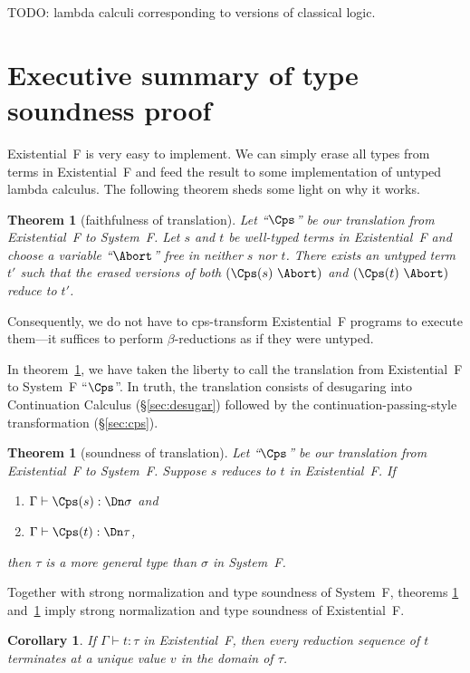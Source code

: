 \documentclass{amsart}
\newtheorem{theorem}[subsection]{Theorem}
\newtheorem{corollary}[subsection]{Corollary}
\begin{document}
TODO: lambda calculi corresponding to versions of classical
logic.


\section{Executive summary of type soundness proof}
\label{sec:exe}

Existential~F is very easy to implement. We can simply erase all
types from terms in Existential~F and feed the result to some
implementation of untyped lambda calculus. The following theorem
sheds some light on why it works.

\begin{theorem}
[faithfulness of translation]
\label{thm:faith}
Let ``$\Cps$'' be our translation from Existential~F to System~F.
Let $s$ and $t$ be well-typed terms in Existential~F and choose a
variable ``$\Abort$'' free in neither $s$ nor $t$. There exists
an untyped term $t'$ such that the erased versions of both
$(\Cps(s)~\Abort)$ and $(\Cps(t)~\Abort)$ reduce to $t'$.
\end{theorem}

Consequently, we do not have to cps-transform Existential~F
programs to execute them---it suffices to perform
$\beta$-reductions as if they were untyped.

In theorem~\ref{thm:faith}, we have taken the liberty to
call the translation from Existential~F to System~F ``$\Cps$''.
In truth, the translation consists of desugaring into
Continuation Calculus (\S\ref{sec:desugar}) followed by
the continuation-passing-style transformation (\S\ref{sec:cps}).

\begin{theorem}
[soundness of translation]
\label{thm:sound}
Let ``$\Cps$'' be our translation from Existential~F to System~F.
Suppose $s$ reduces to $t$ in Existential~F. If
\begin{enumerate}
\item $\Gamma\vdash\Cps(s):\Dn\sigma$ and\/
\item $\Gamma\vdash\Cps(t):\Dn\tau$,
\end{enumerate}
then $\tau$ is a more general type than $\sigma$ in System~F.
\end{theorem}

Together with strong normalization and type soundness of
System~F, theorems \ref{thm:faith} and~\ref{thm:sound} imply
strong normalization and type soundness of Existential~F.

\begin{corollary}
\label{cor:sound}
If\/ $\Gamma\vdash t:\tau$ in Existential~F, then every reduction
sequence of $t$ terminates at a unique value $v$ in the
domain of $\tau$.
\end{corollary}
\end{document}
